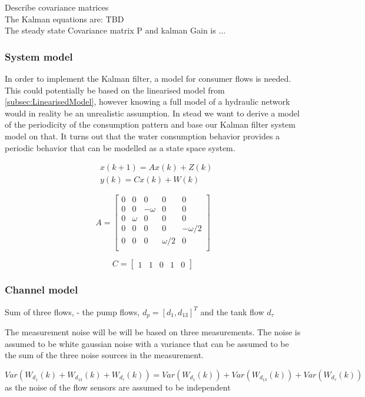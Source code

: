 Describe covariance matrices\\


The Kalman equations are: TBD \\

The steady state Covariance matrix P and kalman Gain is ...




\subsubsection{System model}
In order to implement the Kalman filter, a model for consumer flows is needed. This could potentially be based on the linearised model from \cref{subsec:LinearisedModel}, however knowing a full model of a hydraulic network would in reality be an unrealistic assumption. In stead we want to derive a model of the periodicity of the consumption pattern and base our Kalman filter system model on that. It turns out that the water consumption behavior provides a periodic behavior that can be modelled as a state space system. 

\begin{align}
	&x(k+1) = Ax(k) + Z(k)  \label{eq:KalmanSystemEquations2} \\
	&y(k) = Cx(k)+W(k)
\end{align}

\begin{equation}
	A = \begin{bmatrix}
		0 & 0 		& 0			& 0 		& 0 		\\
		0 & 0 		& -\omega	& 0 		& 0 		\\
		0 & \omega 	& 0			& 0 		& 0 		\\
		0 & 0		& 0			& 0 		& -\omega/2 \\
		0 & 0		& 0			& \omega/2 	& 0 		\\
	\end{bmatrix}
\end{equation}

\begin{equation}
	C = \begin{bmatrix}
		1 & 1 & 0 & 1 & 0 
	\end{bmatrix}
\end{equation}


\subsubsection{Channel model}
Sum of three flows, - the pump flows, $d_p = [d_1, d_{13}]^T$ and the tank flow $d_{\tau}$

The measurement noise will be will be based on three measurements. The noise is assumed to be white gaussian noise with a variance that can be assumed to be the sum of the three noise sources in the measurement. 

\begin{equation}
	Var(W_{d_{1}}(k) + W_{d_{13}}(k) + W_{d_{\tau}}(k)) = Var(W_{d_{1}}(k)) + Var(W_{d_{13}}(k)) +Var(W_{d_{\tau}}(k))
\end{equation}
as the noise of the flow sensors are assumed to be independent 

